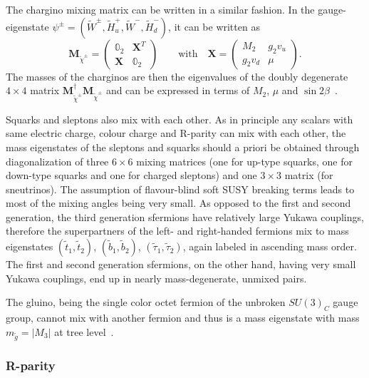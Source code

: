The chargino mixing matrix can be written in a similar fashion. In the gauge-eigenstate $\psi^\pm = (\tilde{W}^\pm , \tilde{H}^+_u, \tilde{W}^-, \tilde{H}^-_d)$, it can be written as
\begin{equation}
	\boldsymbol{M}_{\tilde{\chi}^\pm} = \begin{pmatrix}
		\mathbb{0}_2 & \boldsymbol{X}^T \\
		\boldsymbol{X} & \mathbb{0}_2
	\end{pmatrix}
	\qquad \textrm{with} \quad \boldsymbol{X} = \begin{pmatrix}
		M_2 & g_2 v_u\\
		g_2 v_d & \mu
	\end{pmatrix}.
\end{equation}
The masses of the charginos are then the eigenvalues of the doubly degenerate $4\times 4$ matrix $\boldsymbol{M}^{\dagger}_{\tilde{\chi}^\pm}\boldsymbol{M}_{\tilde{\chi}^\pm}$ and can be expressed in terms of $M_2$, $\mu$ and $\sin{2\beta}$~\cite{Martin:1997ns}. 

Squarks and sleptons also mix with each other. As in principle any scalars with same electric charge, colour charge and R-parity can mix with each other, the mass eigenstates of the sleptons and squarks should a priori be obtained through diagonalization of three $6\times 6$ mixing matrices (one for up-type squarks, one for down-type squarks and one for charged sleptons) and one $3\times 3$ matrix (for sneutrinos). The assumption of flavour-blind soft SUSY breaking terms leads to most of the mixing angles being very small. As opposed to the first and second generation, the third generation sfermions have relatively large Yukawa couplings, therefore the superpartners of the left- and right-handed fermions mix to mass eigenstates $(\tilde{t}_1,\tilde{t}_2)$, $(\tilde{b}_1,\tilde{b}_2)$, $(\tilde{\tau}_1,\tilde{\tau}_2)$, again labeled in ascending mass order. The first and second generation sfermions, on the other hand, having very small Yukawa couplings, end up in nearly mass-degenerate, unmixed pairs.

The gluino, being the single color octet fermion of the unbroken $SU(3)_C$ gauge group, cannot mix with another fermion and thus is a mass eigenstate with mass $m_{\tilde{g}} = \vert M_3 \vert$ at tree level~\cite{Martin:1997ns,baer_tata_2006}.

\subsubsection{R-parity}\label{sec:rparity}

